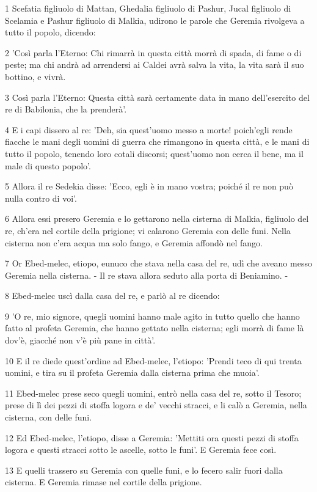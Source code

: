 \par 1 Scefatia figliuolo di Mattan, Ghedalia figliuolo di Pashur, Jucal figliuolo di Scelamia e Pashur figliuolo di Malkia, udirono le parole che Geremia rivolgeva a tutto il popolo, dicendo:
\par 2 'Così parla l'Eterno: Chi rimarrà in questa città morrà di spada, di fame o di peste; ma chi andrà ad arrendersi ai Caldei avrà salva la vita, la vita sarà il suo bottino, e vivrà.
\par 3 Così parla l'Eterno: Questa città sarà certamente data in mano dell'esercito del re di Babilonia, che la prenderà'.
\par 4 E i capi dissero al re: 'Deh, sia quest'uomo messo a morte! poich'egli rende fiacche le mani degli uomini di guerra che rimangono in questa città, e le mani di tutto il popolo, tenendo loro cotali discorsi; quest'uomo non cerca il bene, ma il male di questo popolo'.
\par 5 Allora il re Sedekia disse: 'Ecco, egli è in mano vostra; poiché il re non può nulla contro di voi'.
\par 6 Allora essi presero Geremia e lo gettarono nella cisterna di Malkia, figliuolo del re, ch'era nel cortile della prigione; vi calarono Geremia con delle funi. Nella cisterna non c'era acqua ma solo fango, e Geremia affondò nel fango.
\par 7 Or Ebed-melec, etiopo, eunuco che stava nella casa del re, udì che aveano messo Geremia nella cisterna. - Il re stava allora seduto alla porta di Beniamino. -
\par 8 Ebed-melec uscì dalla casa del re, e parlò al re dicendo:
\par 9 'O re, mio signore, quegli uomini hanno male agito in tutto quello che hanno fatto al profeta Geremia, che hanno gettato nella cisterna; egli morrà di fame là dov'è, giacché non v'è più pane in città'.
\par 10 E il re diede quest'ordine ad Ebed-melec, l'etiopo: 'Prendi teco di qui trenta uomini, e tira su il profeta Geremia dalla cisterna prima che muoia'.
\par 11 Ebed-melec prese seco quegli uomini, entrò nella casa del re, sotto il Tesoro; prese di lì dei pezzi di stoffa logora e de' vecchi stracci, e li calò a Geremia, nella cisterna, con delle funi.
\par 12 Ed Ebed-melec, l'etiopo, disse a Geremia: 'Mettiti ora questi pezzi di stoffa logora e questi stracci sotto le ascelle, sotto le funi'. E Geremia fece così.
\par 13 E quelli trassero su Geremia con quelle funi, e lo fecero salir fuori dalla cisterna. E Geremia rimase nel cortile della prigione.
